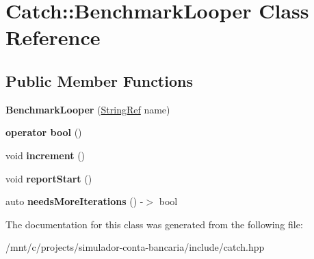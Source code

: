 \hypertarget{classCatch_1_1BenchmarkLooper}{}\section{Catch\+:\+:Benchmark\+Looper Class Reference}
\label{classCatch_1_1BenchmarkLooper}
\subsection*{Public Member Functions}
\begin{DoxyCompactItemize}
\item 
\mbox{\label{classCatch_1_1BenchmarkLooper_ab9ba6397306a70082f39e63a8a71bde6}} 
{\bfseries Benchmark\+Looper} (\hyperlink{classCatch_1_1StringRef}{String\+Ref} name)
\item 
\mbox{\label{classCatch_1_1BenchmarkLooper_a54da41bada9da038dc05faf41d746765}} 
{\bfseries operator bool} ()
\item 
\mbox{\label{classCatch_1_1BenchmarkLooper_a210552aff5b19408637444d4bb35d59c}} 
void {\bfseries increment} ()
\item 
\mbox{\label{classCatch_1_1BenchmarkLooper_a0697d1b266112b110edf2025b82c4e77}} 
void {\bfseries report\+Start} ()
\item 
\mbox{\label{classCatch_1_1BenchmarkLooper_a97bd944521f519b1593a5d1d2f9998fa}} 
auto {\bfseries needs\+More\+Iterations} () -\/$>$ bool
\end{DoxyCompactItemize}


The documentation for this class was generated from the following file\+:\begin{DoxyCompactItemize}
\item 
/mnt/c/projects/simulador-\/conta-\/bancaria/include/catch.\+hpp\end{DoxyCompactItemize}
